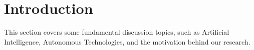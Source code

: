 \chapter{Introduction}
This section covers some fundamental discussion topics, such as Artificial Intelligence, Autonomous Technologies, and the motivation behind our research. 


